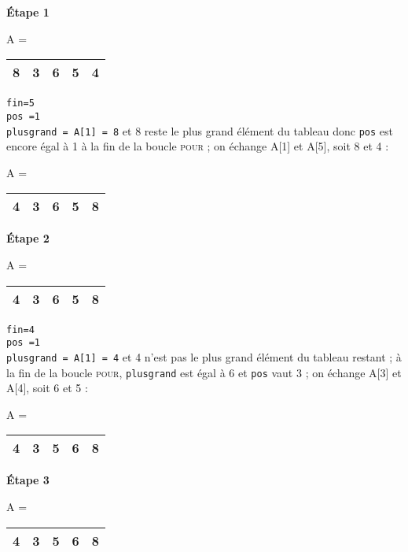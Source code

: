 \documentclass[a4paper,french]{article}
\begin{document}
{\textbf{Étape 1} 

\begin{center}
\setlength{\extrarowheight}{1mm}
A = \begin{tabular}{|c|c|c|c|c|}
\hline 
\textbf{8} & 3 & 6 & 5 & 4 \\ 
\hline 
\end{tabular} 
\end{center}
\texttt{fin=5}
\\
\texttt{pos =1}
\\
\texttt{plusgrand = A[1] = 8}  et 8 reste le plus grand élément du tableau donc \texttt{pos} est encore égal à 1 à la fin de la boucle \textsc{pour} ; on échange A[1] et A[5], soit 8 et 4 :
\begin{center}
\setlength{\extrarowheight}{1mm}
A = \begin{tabular}{|c|c|c|c|c|}
\hline 
\textbf{4} & 3 & 6 & 5 & \textbf{8} \\ 
\hline 
\end{tabular} 
\end{center}

\textbf{Étape 2} 
\begin{center}
\setlength{\extrarowheight}{1mm}
A = \begin{tabular}{|c|c|c|c|c|}
\hline 
\textbf{4} & 3 & 6 & 5 & 8\\ 
\hline 
\end{tabular} 
\end{center}

\texttt{fin=4}
\\
\texttt{pos =1}
\\
\texttt{plusgrand = A[1] = 4}  et 4 n'est pas le plus grand élément du tableau restant ; à la fin de la boucle \textsc{pour}, \texttt{plusgrand} est égal à 6 et \texttt{pos} vaut 3 ; on échange A[3] et A[4], soit 6 et 5 :
\begin{center}
\setlength{\extrarowheight}{1mm}
A = \begin{tabular}{|c|c|c|c|c|}
\hline 
4 & 3 & \textbf{5} & \textbf{6} & 8 \\ 
\hline 
\end{tabular} 
\end{center}

\textbf{Étape 3} 
\begin{center}
\setlength{\extrarowheight}{1mm}
A = \begin{tabular}{|c|c|c|c|c|}
\hline 
\textbf{4} & 3 & 5 & 6 & 8 \\ 
\hline 
\end{tabular} 
\end{center}

}
\end{document}
